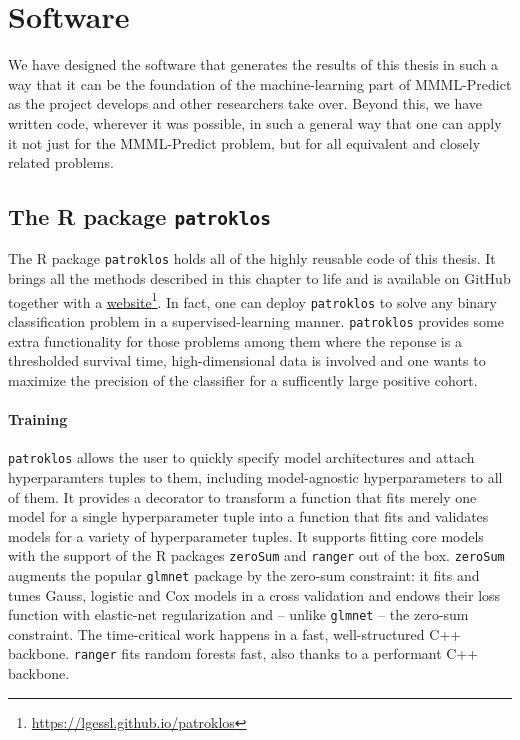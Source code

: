 \section{Software}

We have designed the software that generates the results of this thesis in such a way that it 
can be the foundation of the machine-learning part of MMML-Predict as the project develops and 
other researchers take over. Beyond this, we have written code, wherever it was possible, in such 
a general way that one can apply it not just for the MMML-Predict problem, but for all equivalent 
and closely related problems.

\subsection{The R package \texttt{patroklos}}
The R package \texttt{patroklos} holds all of the highly reusable code of this thesis. It brings 
all the methods described in this chapter to life and is available on GitHub \cite{patroklos-gh} 
together with a 
\href{https://lgessl.github.io/patroklos/}{website}\footnote{\url{https://lgessl.github.io/patroklos}}. 
In fact, one can deploy 
\texttt{patroklos} to solve any binary classification problem in a supervised-learning manner.
\texttt{patroklos} provides some extra functionality for those problems among them where the 
reponse is a thresholded survival time, high-dimensional data is involved and one wants to maximize 
the precision of the classifier for a sufficently large positive cohort.

\paragraph{Training} 
\texttt{patroklos} allows the user to quickly specify model architectures and 
attach hyperparamters tuples to them, including model-agnostic hyperparameters to all of them. It 
provides a decorator to transform a function that fits merely one model for a single hyperparameter 
tuple into a function that fits and validates models for a variety of hyperparameter tuples. 
It supports fitting core models with the support of the R packages \texttt{zeroSum} 
\cite{zerosumR} and \texttt{ranger} \cite{ranger-gh} out of the box. \texttt{zeroSum} 
augments the popular \texttt{glmnet} package by the zero-sum constraint: it fits and 
tunes Gauss, logistic and Cox models in a cross validation and endows their loss function 
with elastic-net regularization and -- unlike \texttt{glmnet} -- the zero-sum 
constraint. The time-critical work happens in a fast, well-structured C++ backbone. 
\texttt{ranger} fits random forests fast, also thanks to a performant C++ backbone. 

